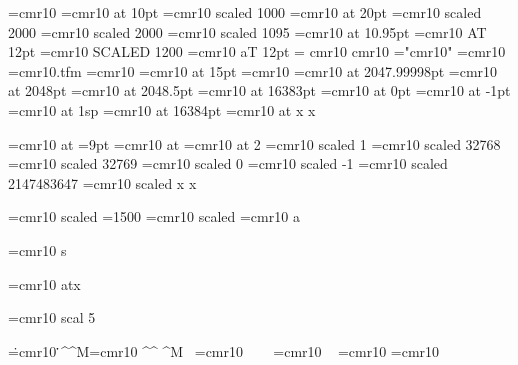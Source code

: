 
\def\w#1{\show#1\showthe#1 }
\font\a=cmr10 \w\a \message{\fontname\a}
\font\a=cmr10 at 10pt \w\a
\font\a=cmr10 scaled 1000 \w\a
\font\a=cmr10 at 20pt \w\a
\font\a=cmr10 scaled 2000 \w\a
\font\a=cmr10 scaled 2000 \w\a
\font\a=cmr10 scaled 1095 \w\a
\font\a=cmr10 at 10.95pt \w\a
\font\a=cmr10 AT 12pt \w\a
\font\a=cmr10 SCALED 1200 \w\a
\font\a=cmr10 aT 12pt \w\a
\font\a= cmr10 \w\a
\font\a cmr10 \w\a
\font\a="cmr10" \w\a
\font\a={cmr10} \w\a
\font\a=cmr10.tfm \w\a
\def\n{cmr10}\font\a=\n \w\a
\def\s{at 15pt}\font\a=cmr10 \s \w\a
\font\a=cmr10 \relax \w\a
\font\a=cmr10 at 2047.99998pt \w\a
\font\a=cmr10 at 2048pt \w\a
\font\a=cmr10 at 2048.5pt \w\a
\font\a=cmr10 at 16383pt \w\a
\font\a=cmr10 at 0pt \w\a
\font\a=cmr10 at -1pt \w\a
\font\a=cmr10 at 1sp \w\a
\font\a=cmr10 at 16384pt \w\a
\font\a=cmr10 at x \w\a x\par
\font\a=cmr10 at \w\a
{}=9pt \font\a=cmr10 at  \w\a
\font\a=cmr10 at 2 \w\a
\font\a=cmr10 scaled 1 \w\a
\font\a=cmr10 scaled 32768 \w\a
\font\a=cmr10 scaled 32769 \w\a
\font\a=cmr10 scaled 0 \w\a
\font\a=cmr10 scaled -1 \w\a
\font\a=cmr10 scaled 2147483647 \w\a
\font\a=cmr10 scaled x \w\a x\par
\font\a=cmr10 scaled \w\a
{}=1500 \font\a=cmr10 scaled  \w\a
\font\a=cmr10 a \w\a \par
\font\a=cmr10 s \w\a \par
\font\a=cmr10 atx \w\a \par
\font\a=cmr10 scal 5 \w\a \par
\font\.=cmr10 \w\.
\font\^^M=cmr10 \w\^^M
\font\ =cmr10 \w\ %
\font~=cmr10 \w~
\font\relax=cmr10 \showthe\relax
\let\relax=\undefinedone
\expandafter\font\csname\endcsname=cmr10 \expandafter\w\csname\endcsname
